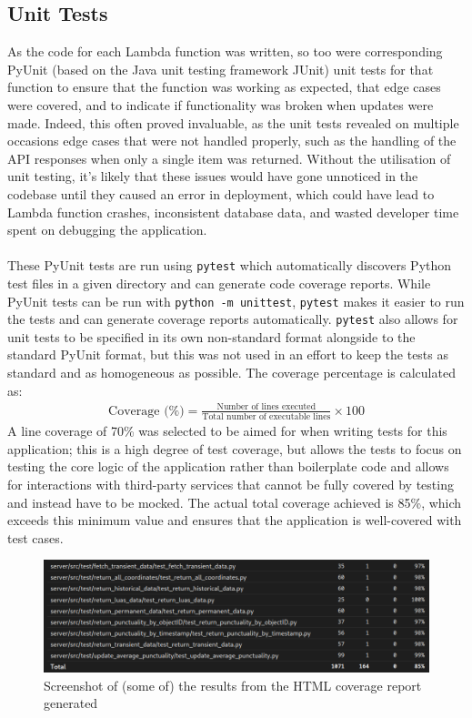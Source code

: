 \documentclass[a4paper,11pt]{report}
\begin{document}
\subsection{Unit Tests}
As the code for each Lambda function was written, so too were corresponding PyUnit\supercite{pyunit} (based on the Java unit testing framework JUnit\supercite{junit}) unit tests for that function to ensure that the function was working as expected, that edge cases were covered, and to indicate if functionality was broken when updates were made.
Indeed, this often proved invaluable, as the unit tests revealed on multiple occasions edge cases that were not handled properly, such as the handling of the API responses when only a single item was returned.
Without the utilisation of unit testing, it's likely that these issues would have gone unnoticed in the codebase until they caused an error in deployment, which could have lead to Lambda function crashes, inconsistent database data, and wasted developer time spent on debugging the application.
\\\\
These PyUnit tests are run using \texttt{pytest}\supercite{pytest} which automatically discovers Python test files in a given directory and can generate code coverage reports.
While PyUnit tests can be run with \texttt{python -m unittest}, \texttt{pytest} makes it easier to run the tests and can generate coverage reports automatically.
\texttt{pytest} also allows for unit tests to be specified in its own non-standard format alongside to the standard PyUnit format, but this was not used in an effort to keep the tests as standard and as homogeneous as possible.
The coverage percentage is calculated as:
\begin{align*}
    \text{Coverage (\%)} = \frac{\text{Number of lines executed}}{\text{Total number of executable lines}} \times 100
\end{align*}
A line coverage of 70\% was selected to be aimed for when writing tests for this application;
this is a high degree of test coverage, but allows the tests to focus on testing the core logic of the application rather than boilerplate code and allows for interactions with third-party services that cannot be fully covered by testing and instead have to be mocked\supercite{pyunitmock}.
The actual total coverage achieved is 85\%, which exceeds this minimum value and ensures that the application is well-covered with test cases.

\begin{figure}[H]
    \centering
    \includegraphics[width=\textwidth]{./images/testcoverage.png}
    \caption{Screenshot of (some of) the results from the HTML coverage report generated}
\end{figure}
\end{document}
